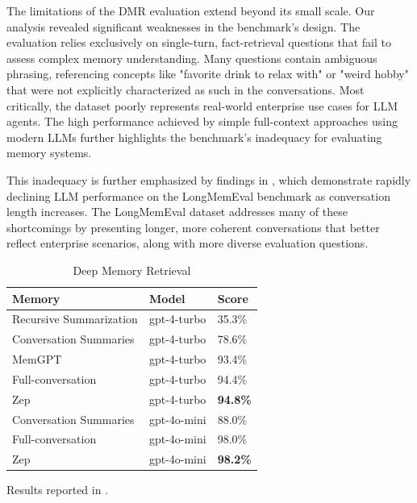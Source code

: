 \documentclass{article}
\begin{document}
The limitations of the DMR evaluation extend beyond its small scale. Our analysis revealed significant weaknesses in the benchmark's design. The evaluation relies exclusively on single-turn, fact-retrieval questions that fail to assess complex memory understanding. Many questions contain ambiguous phrasing, referencing concepts like "favorite drink to relax with" or "weird hobby" that were not explicitly characterized as such in the conversations. Most critically, the dataset poorly represents real-world enterprise use cases for LLM agents. The high performance achieved by simple full-context approaches using modern LLMs further highlights the benchmark's inadequacy for evaluating memory systems.

This inadequacy is further emphasized by findings in \cite{longmemeval}, which demonstrate rapidly declining LLM performance on the LongMemEval benchmark as conversation length increases. The LongMemEval dataset \cite{longmemeval} addresses many of these shortcomings by presenting longer, more coherent conversations that better reflect enterprise scenarios, along with more diverse evaluation questions.

\begin{table}
\centering
\begin{threeparttable}
\caption{Deep Memory Retrieval}
\centering
\begin{tabular}{lll}
\toprule
Memory                        & Model         & Score      \\
\midrule
Recursive Summarization\tnote{†} & gpt-4-turbo  & 35.3\%     \\
Conversation Summaries         & gpt-4-turbo  & 78.6\%     \\
MemGPT\tnote{†}      & gpt-4-turbo  & 93.4\%     \\
Full-conversation              & gpt-4-turbo  & 94.4\%     \\
Zep                            & gpt-4-turbo  & \textbf{94.8\%} \\
\midrule
Conversation Summaries         & gpt-4o-mini  & 88.0\%     \\
Full-conversation              & gpt-4o-mini  & 98.0\%     \\
Zep                            & gpt-4o-mini  & \textbf{98.2\%} \\
\bottomrule
\end{tabular}
\begin{tablenotes}
\item[†] Results reported in \cite{memgpt}.
\end{tablenotes}
\end{threeparttable}
\label{tab:dmrtable}
\end{table}
\end{document}
